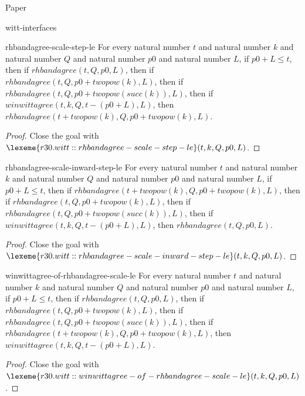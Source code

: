 \begin{lexlean}{Paper}
\begin{section}{witt-interfaces}
  \begin{theorem}{rhbandagree-scale-step-le}
  For every natural number \(t\) and natural number \(k\) and natural number \(Q\) and natural number \(p0\) and natural number \(L\), if \(p0 + L ≤ t\), then if \(rhbandagree(t, Q, p0, L)\), then if \(rhbandagree(t, Q, p0 + twopow(k), L)\), then if \(rhbandagree(t, Q, p0 + twopow(succ(k)), L)\), then if \(winwittagree(t, k, Q, t - (p0 + L), L)\), then \(rhbandagree(t + twopow(k), Q, p0 + twopow(k), L)\).
  \begin{proof}
  Close the goal with \(\lexeme{r30.witt::rhbandagree-scale-step-le}(t, k, Q, p0, L)\).
  \end{proof}
  \end{theorem}

  \begin{theorem}{rhbandagree-scale-inward-step-le}
  For every natural number \(t\) and natural number \(k\) and natural number \(Q\) and natural number \(p0\) and natural number \(L\), if \(p0 + L ≤ t\), then if \(rhbandagree(t + twopow(k), Q, p0 + twopow(k), L)\), then if \(rhbandagree(t, Q, p0 + twopow(k), L)\), then if \(rhbandagree(t, Q, p0 + twopow(succ(k)), L)\), then if \(winwittagree(t, k, Q, t - (p0 + L), L)\), then \(rhbandagree(t, Q, p0, L)\).
  \begin{proof}
  Close the goal with \(\lexeme{r30.witt::rhbandagree-scale-inward-step-le}(t, k, Q, p0, L)\).
  \end{proof}
  \end{theorem}

  \begin{theorem}{winwittagree-of-rhbandagree-scale-le}
  For every natural number \(t\) and natural number \(k\) and natural number \(Q\) and natural number \(p0\) and natural number \(L\), if \(p0 + L ≤ t\), then if \(rhbandagree(t, Q, p0, L)\), then if \(rhbandagree(t, Q, p0 + twopow(k), L)\), then if \(rhbandagree(t, Q, p0 + twopow(succ(k)), L)\), then if \(rhbandagree(t + twopow(k), Q, p0 + twopow(k), L)\), then \(winwittagree(t, k, Q, t - (p0 + L), L)\).
  \begin{proof}
  Close the goal with \(\lexeme{r30.witt::winwittagree-of-rhbandagree-scale-le}(t, k, Q, p0, L)\).
  \end{proof}
  \end{theorem}


\end{section}
\end{lexlean}
